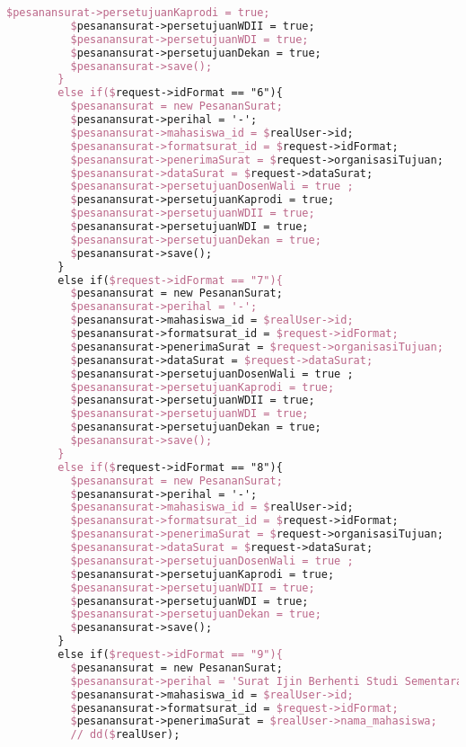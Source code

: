 \begin{lstlisting}[language=tex,basicstyle=\tiny,caption=PesanansuratController.php]
          $pesanansurat->persetujuanKaprodi = true;
          $pesanansurat->persetujuanWDII = true;
          $pesanansurat->persetujuanWDI = true;
          $pesanansurat->persetujuanDekan = true;
          $pesanansurat->save();
        }
        else if($request->idFormat == "6"){
          $pesanansurat = new PesananSurat;
          $pesanansurat->perihal = '-';
          $pesanansurat->mahasiswa_id = $realUser->id;
          $pesanansurat->formatsurat_id = $request->idFormat;
          $pesanansurat->penerimaSurat = $request->organisasiTujuan;
          $pesanansurat->dataSurat = $request->dataSurat;
          $pesanansurat->persetujuanDosenWali = true ;
          $pesanansurat->persetujuanKaprodi = true;
          $pesanansurat->persetujuanWDII = true;
          $pesanansurat->persetujuanWDI = true;
          $pesanansurat->persetujuanDekan = true;
          $pesanansurat->save();
        }
        else if($request->idFormat == "7"){
          $pesanansurat = new PesananSurat;
          $pesanansurat->perihal = '-';
          $pesanansurat->mahasiswa_id = $realUser->id;
          $pesanansurat->formatsurat_id = $request->idFormat;
          $pesanansurat->penerimaSurat = $request->organisasiTujuan;
          $pesanansurat->dataSurat = $request->dataSurat;
          $pesanansurat->persetujuanDosenWali = true ;
          $pesanansurat->persetujuanKaprodi = true;
          $pesanansurat->persetujuanWDII = true;
          $pesanansurat->persetujuanWDI = true;
          $pesanansurat->persetujuanDekan = true;
          $pesanansurat->save();
        }
        else if($request->idFormat == "8"){
          $pesanansurat = new PesananSurat;
          $pesanansurat->perihal = '-';
          $pesanansurat->mahasiswa_id = $realUser->id;
          $pesanansurat->formatsurat_id = $request->idFormat;
          $pesanansurat->penerimaSurat = $request->organisasiTujuan;
          $pesanansurat->dataSurat = $request->dataSurat;
          $pesanansurat->persetujuanDosenWali = true ;
          $pesanansurat->persetujuanKaprodi = true;
          $pesanansurat->persetujuanWDII = true;
          $pesanansurat->persetujuanWDI = true;
          $pesanansurat->persetujuanDekan = true;
          $pesanansurat->save();
        }
        else if($request->idFormat == "9"){
          $pesanansurat = new PesananSurat;
          $pesanansurat->perihal = 'Surat Ijin Berhenti Studi Sementara';
          $pesanansurat->mahasiswa_id = $realUser->id;
          $pesanansurat->formatsurat_id = $request->idFormat;
          $pesanansurat->penerimaSurat = $realUser->nama_mahasiswa;
          // dd($realUser);

\end{lstlisting}
